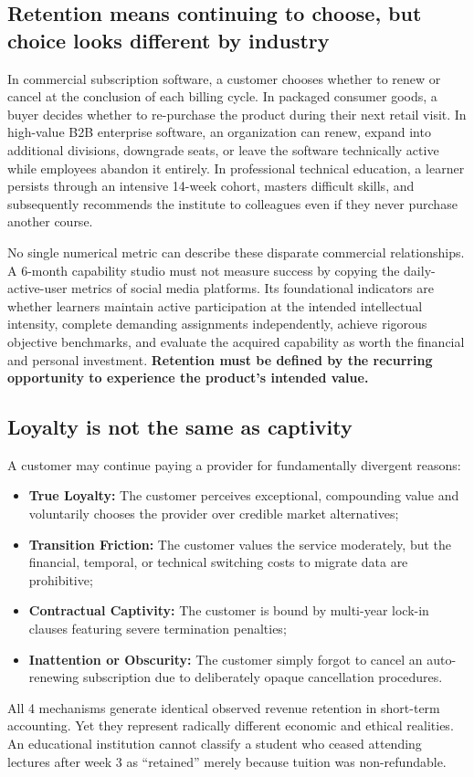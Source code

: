 \subsection{Retention means continuing to choose, but choice looks different by industry}

In commercial subscription software, a customer chooses whether to renew or cancel at the conclusion of each billing cycle. In packaged consumer goods, a buyer decides whether to re-purchase the product during their next retail visit. In high-value B2B enterprise software, an organization can renew, expand into additional divisions, downgrade seats, or leave the software technically active while employees abandon it entirely. In professional technical education, a learner persists through an intensive 14-week cohort, masters difficult skills, and subsequently recommends the institute to colleagues even if they never purchase another course.

No single numerical metric can describe these disparate commercial relationships. A 6-month capability studio must not measure success by copying the daily-active-user metrics of social media platforms. Its foundational indicators are whether learners maintain active participation at the intended intellectual intensity, complete demanding assignments independently, achieve rigorous objective benchmarks, and evaluate the acquired capability as worth the financial and personal investment. \textbf{Retention must be defined by the recurring opportunity to experience the product's intended value.}

\subsection{Loyalty is not the same as captivity}

A customer may continue paying a provider for fundamentally divergent reasons:
\begin{itemize}
\item \textbf{True Loyalty:} The customer perceives exceptional, compounding value and voluntarily chooses the provider over credible market alternatives;
\item \textbf{Transition Friction:} The customer values the service moderately, but the financial, temporal, or technical switching costs to migrate data are prohibitive;
\item \textbf{Contractual Captivity:} The customer is bound by multi-year lock-in clauses featuring severe termination penalties;
\item \textbf{Inattention or Obscurity:} The customer simply forgot to cancel an auto-renewing subscription due to deliberately opaque cancellation procedures.
\end{itemize}
All 4 mechanisms generate identical observed revenue retention in short-term accounting. Yet they represent radically different economic and ethical realities. An educational institution cannot classify a student who ceased attending lectures after week 3 as ``retained'' merely because tuition was non-refundable.

